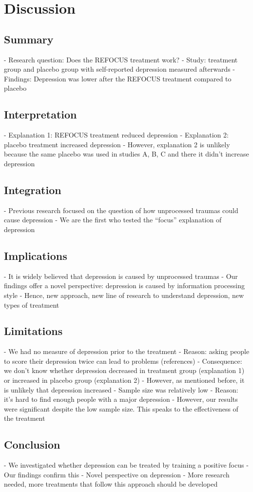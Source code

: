 \chapter{Discussion}

\section{Summary}
\label{summary}

- Research question: Does the REFOCUS treatment work?
- Study: treatment group and placebo group with self-reported depression measured afterwards
- Findings: Depression was lower after the REFOCUS treatment compared to placebo

\section{Interpretation}
\label{interpretation}

- Explanation 1: REFOCUS treatment reduced depression
- Explanation 2: placebo treatment increased depression
- However, explanation 2 is unlikely because the same placebo was used in studies
A, B, C and there it didn’t increase depression

\section{Integration}
\label{integration}

- Previous research focused on the question of how unprocessed traumas could cause
depression
- We are the first who tested the “focus” explanation of depression

\section{Implications}
\label{implications}

- It is widely believed that depression is caused by unprocessed traumas
- Our findings offer a novel perspective: depression is caused by information
processing style
- Hence, new approach, new line of research to understand depression, new types of
treatment

\section{Limitations}
\label{limitations}

- We had no measure of depression prior to the treatment
- Reason: asking people to score their depression twice can lead to problems
(references)
- Consequence: we don’t know whether depression decreased in treatment
group (explanation 1) or increased in placebo group (explanation 2)
- However, as mentioned before, it is unlikely that depression increased
- Sample size was relatively low
- Reason: it’s hard to find enough people with a major depression
- However, our results were significant despite the low sample size. This speaks
to the effectiveness of the treatment

\section{Conclusion}
\label{conclusion}

- We investigated whether depression can be treated by training a positive focus
- Our findings confirm this
- Novel perspective on depression
- More research needed, more treatments that follow this approach should be developed